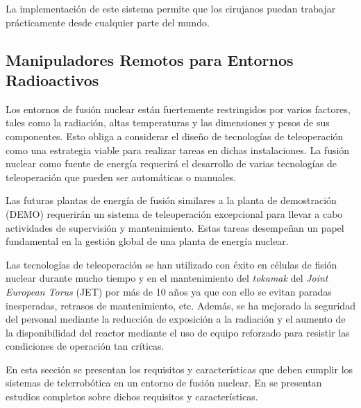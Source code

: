 La implementación de este sistema permite que los cirujanos puedan trabajar prácticamente desde cualquier parte del mundo.\\



%

\subsection{Manipuladores Remotos para Entornos Radioactivos}

Los entornos de fusión nuclear están fuertemente restringidos por varios factores, tales como la radiación, altas temperaturas y las dimensiones y pesos de sus componentes. Esto obliga a considerar el diseño de tecnologías de teleoperación como una estrategia viable para realizar tareas en dichas instalaciones.
La fusión nuclear como fuente de energía requerirá el desarrollo de varias tecnologías de teleoperación que pueden ser automáticas o manuales.

Las futuras plantas de energía de fusión similares a la planta de demostración (DEMO) requerirán un sistema de teleoperación excepcional para llevar a cabo actividades de supervisión y mantenimiento. Estas tareas desempeñan un papel fundamental en la gestión global de una planta de energía nuclear.

Las tecnologías de teleoperación se han utilizado con éxito en células de fisión nuclear durante mucho tiempo \cite{Desbats2005} y en el mantenimiento del \textit{tokamak} del \textit{Joint European Torus} (JET) por más de 10 años \cite{Rolfe1999, Rolfe2007} ya que con ello se evitan paradas inesperadas, retrasos de mantenimiento, etc. Además, se ha mejorado la seguridad del personal mediante la reducción de exposición a la radiación y el aumento de la disponibilidad del reactor mediante el uso de equipo reforzado para resistir las condiciones de operación tan cr\'iticas.

En esta sección se presentan los requisitos y características que deben cumplir los sistemas de telerrobótica en un entorno de fusión nuclear. En \cite{Ferre2011,Suarez2011,Queral2011} se presentan estudios completos sobre dichos requisitos y características.

